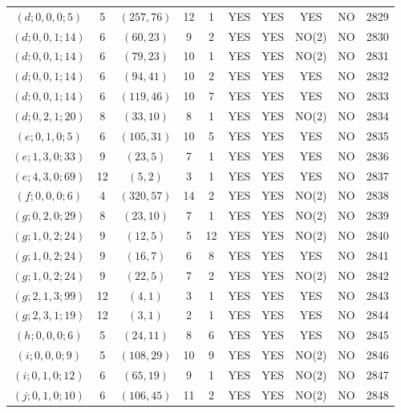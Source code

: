 \begin{longtable}{|c|c|c|c|c|c|c|c|c|c|}
$(d; 0, 0, 0; 5)$ & 5 & $(257, 76)$ & 12 & 1 & YES & YES & YES & NO & 2829\\
$(d; 0, 0, 1; 14)$ & 6 & $(60, 23)$ & 9 & 2 & YES & YES & NO(2) & NO & 2830\\
$(d; 0, 0, 1; 14)$ & 6 & $(79, 23)$ & 10 & 1 & YES & YES & NO(2) & NO & 2831\\
$(d; 0, 0, 1; 14)$ & 6 & $(94, 41)$ & 10 & 2 & YES & YES & YES & NO & 2832\\
$(d; 0, 0, 1; 14)$ & 6 & $(119, 46)$ & 10 & 7 & YES & YES & YES & NO & 2833\\
$(d; 0, 2, 1; 20)$ & 8 & $(33, 10)$ & 8 & 1 & YES & YES & NO(2) & NO & 2834\\
$(e; 0, 1, 0; 5)$ & 6 & $(105, 31)$ & 10 & 5 & YES & YES & YES & NO & 2835\\
$(e; 1, 3, 0; 33)$ & 9 & $(23, 5)$ & 7 & 1 & YES & YES & YES & NO & 2836\\
$(e; 4, 3, 0; 69)$ & 12 & $(5, 2)$ & 3 & 1 & YES & YES & YES & NO & 2837\\
$(f; 0, 0, 0; 6)$ & 4 & $(320, 57)$ & 14 & 2 & YES & YES & NO(2) & NO & 2838\\
$(g; 0, 2, 0; 29)$ & 8 & $(23, 10)$ & 7 & 1 & YES & YES & NO(2) & NO & 2839\\
$(g; 1, 0, 2; 24)$ & 9 & $(12, 5)$ & 5 & 12 & YES & YES & NO(2) & NO & 2840\\
$(g; 1, 0, 2; 24)$ & 9 & $(16, 7)$ & 6 & 8 & YES & YES & YES & NO & 2841\\
$(g; 1, 0, 2; 24)$ & 9 & $(22, 5)$ & 7 & 2 & YES & YES & NO(2) & NO & 2842\\
$(g; 2, 1, 3; 99)$ & 12 & $(4, 1)$ & 3 & 1 & YES & YES & YES & NO & 2843\\
$(g; 2, 3, 1; 19)$ & 12 & $(3, 1)$ & 2 & 1 & YES & YES & YES & NO & 2844\\
$(h; 0, 0, 0; 6)$ & 5 & $(24, 11)$ & 8 & 6 & YES & YES & YES & NO & 2845\\
$(i; 0, 0, 0; 9)$ & 5 & $(108, 29)$ & 10 & 9 & YES & YES & NO(2) & NO & 2846\\
$(i; 0, 1, 0; 12)$ & 6 & $(65, 19)$ & 9 & 1 & YES & YES & NO(2) & NO & 2847\\
$(j; 0, 1, 0; 10)$ & 6 & $(106, 45)$ & 11 & 2 & YES & YES & NO(2) & NO & 2848
\end{longtable}
